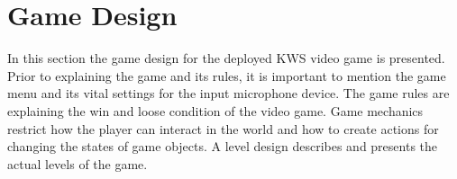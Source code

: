 
\section{Game Design}\label{sec:game_design}
\thesisStateNotReady
In this section the game design for the deployed KWS video game is presented.
Prior to explaining the game and its rules, it is important to mention the game menu and its vital settings for the input microphone device.
The game rules are explaining the win and loose condition of the video game.
Game mechanics restrict how the player can interact in the world and how to create actions for changing the states of game objects.
A level design describes and presents the actual levels of the game.



